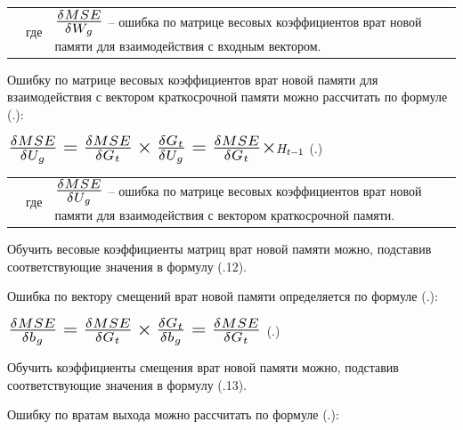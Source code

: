 {  \begin{tabular}{p{}p{}p{}}
		& где  & $\scaleto{\frac{\delta MSE}{\delta W_g}}{21pt}$ {--} ошибка по матрице весовых коэффициентов врат новой памяти для взаимодействия с входным вектором. \\
  \end{tabular}

  \par \redline Ошибку по матрице весовых коэффициентов врат новой памяти для взаимодействия с вектором краткосрочной памяти можно рассчитать по формуле (\thechaptercntr .\theformulacntr):

  \formulaspace \par \redline 
    $\scaleto{\frac{\delta MSE}{\delta U_g} = \frac{\delta MSE}{\delta G_t} \times \frac{\delta G_t}{\delta U_g} = \frac{\delta MSE}{\delta G_t} \times }{22pt}H_{t-1}$
    \hfill (\thechaptercntr .\theformulacntr) \redline
  \formulaspace \addtocounter{formulacntr}{1}

  \begin{tabular}{p{}p{}p{}}
		& где  & $\scaleto{\frac{\delta MSE}{\delta U_g}}{21pt}$ {--} ошибка по матрице весовых коэффициентов врат новой памяти для взаимодействия с вектором краткосрочной памяти. \\
  \end{tabular}

  \par \redline Обучить весовые коэффициенты матриц врат новой памяти можно, подставив соответствующие значения в формулу (\thechaptercntr .12).

  \par \redline Ошибка по вектору смещений врат новой памяти определяется по формуле (\thechaptercntr .\theformulacntr):

  \formulaspace \par \redline 
    $\scaleto{\frac{\delta MSE}{\delta b_g} = \frac{\delta MSE}{\delta G_t} \times \frac{\delta G_t}{\delta b_g} = \frac{\delta MSE}{\delta G_t}}{22pt}$
    \hfill (\thechaptercntr .\theformulacntr) \redline
  \formulaspace \addtocounter{formulacntr}{1}

  \par \redline Обучить коэффициенты смещения врат новой памяти можно, подставив соответствующие значения в формулу (\thechaptercntr .13).

  \par \redline Ошибку по вратам выхода можно рассчитать по формуле (\thechaptercntr .\theformulacntr):

}
